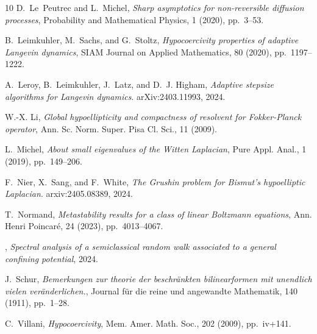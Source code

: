 \documentclass[12pt]{amsart}
\numberwithin{equation}{section}
\numberwithin{figure}{section}
\begin{document}
\begin{thebibliography}{10}
{\sc D.~Le~Peutrec and L.~Michel}, {\em Sharp asymptotics for non-reversible diffusion processes}, Probability and Mathematical Physics, 1 (2020), pp.~3--53.

{\sc B.~Leimkuhler, M.~Sachs, and G.~Stoltz}, {\em Hypocoercivity properties of adaptive {L}angevin dynamics}, {SIAM Journal on Applied Mathematics}, 80 (2020), pp.~1197--1222.

{\sc A.~Leroy, B.~Leimkuhler, J.~Latz, and D.~J. Higham}, {\em Adaptive stepsize algorithms for {L}angevin dynamics}.
\newblock arXiv:2403.11993, 2024.

{\sc W.-X. Li}, {\em Global hypoellipticity and compactness of resolvent for {F}okker-{P}lanck operator}, Ann. Sc. Norm. Super. Pisa Cl. Sci., 11 (2009).

{\sc L.~Michel}, {\em {A}bout small eigenvalues of the {W}itten {L}aplacian}, Pure Appl. Anal., 1 (2019), pp.~149--206.

{\sc F.~Nier, X.~Sang, and F.~White}, {\em The {G}rushin problem for {B}ismut's hypoelliptic {L}aplacian}.
\newblock arxiv:2405.08389, 2024.

{\sc T.~Normand}, {\em Metastability results for a class of linear {B}oltzmann equations}, Ann. Henri Poincar\'{e}, 24 (2023), pp.~4013--4067.

\bysame, {\em Spectral analysis of a semiclassical random walk associated to a general confining potential}, 2024.

{\sc J.~Schur}, {\em Bemerkungen zur theorie der beschränkten bilinearformen mit unendlich vielen veränderlichen.}, Journal für die reine und angewandte Mathematik, 140 (1911), pp.~1--28.

{\sc C.~Villani}, {\em Hypocoercivity}, Mem. Amer. Math. Soc., 202 (2009), pp.~iv+141.
\end{thebibliography}
\end{document}
